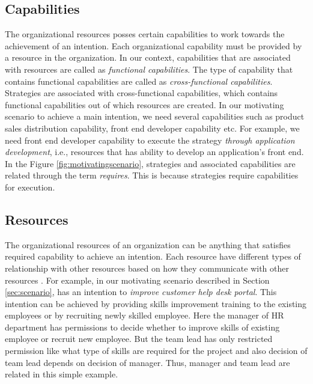 \subsection{Capabilities}
\label{sec:capabilities}
The organizational resources posses certain capabilities to work towards the achievement of an intention. Each organizational capability must be provided by a resource in the organization. In our context, capabilities that are associated with resources are called as \textit{functional capabilities}. The type of capability that contains functional capabilities are called as \textit{cross-functional capabilities}. Strategies are associated with cross-functional capabilities, which contains functional capabilities out of which resources are created. In our motivating scenario to achieve a main intention, we need several capabilities such as product sales distribution capability, front end developer capability etc. For example, we need front end developer capability to execute the strategy \textit{through application development}, i.e., resources that has ability to develop an application's front end. In the Figure \ref{fig:motivatingscenario}, strategies and associated capabilities are related through the term \textit{requires}. This is because strategies require capabilities for execution. 

\subsection{Resources} 
\label{sec:resources}
The organizational resources of an organization can be anything that satisfies required capability to achieve an intention. Each resource have different types of relationship with other resources based on how they communicate with other resources \cite{Sungur2015}. For example, in our motivating scenario described in Section \ref{sec:scenario}, has an intention to \textit{improve customer help desk portal}. This intention can be achieved by providing skills improvement training to the existing employees or by recruiting newly skilled employee. Here the manager of HR department has permissions to decide whether to improve skills of existing employee or recruit new employee. But the team lead has only restricted permission like what type of skills are required for the project and also decision of team lead depends on decision of manager. Thus, manager and team lead are related in this simple example. 
